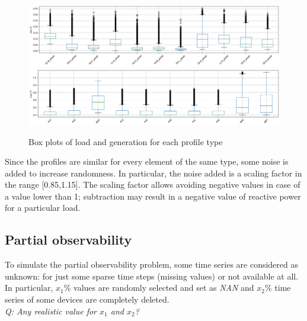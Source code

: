 \begin{figure}[H]
\centering
    \includegraphics[width=.8\linewidth]{images/MVOberr/BoxPlotLoad.png}
    \includegraphics[width=.8\linewidth]{images/MVOberr/BoxPlotRes.png}
\caption[Box plots of load and generation]{Box plots of load and generation for each profile type}
\end{figure}

Since the profiles are similar for every element of the same type, some noise is added to increase randomness. In particular, the noise added is a scaling factor in the range [0.85,1.15]. The scaling factor allows avoiding negative values in case of a value lower than 1; subtraction may result in a negative value of reactive power for a particular load. \\

\subsection{Partial observability}
To simulate the partial observability problem, some time series are considered as unknown: for just some sparse time steps (missing values) or not available at all. \\

In particular, $x_1\%$ values are randomly selected and set as \emph{NAN} and $x_2\%$ time series of some devices are completely deleted.\\
\emph{Q: Any realistic value for $x_1$ and $x_2$? \label{q:partialobvals}} \\


